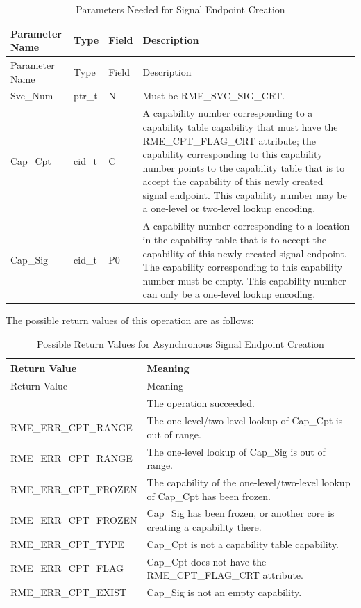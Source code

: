 \begin{xltabular}{\textwidth}{@{}>{\hsize\raggedright\arraybackslash}X>{\hsize\raggedright\arraybackslash}X>{\hsize\raggedright\arraybackslash}X>{\hsize\raggedright\arraybackslash}X@{}}
\caption{Parameters Needed for Signal Endpoint Creation}\label{tab:5-16-create-signal-endpoint-parameters}\\
\toprule
Parameter Name & Type & Field & Description\tabularnewline
\endfirsthead
\toprule
Parameter Name & Type & Field & Description\tabularnewline
\midrule
\endhead
\bottomrule
\endlastfoot
Svc\_Num & ptr\_t & N & Must be RME\_SVC\_SIG\_CRT.\tabularnewline
Cap\_Cpt & cid\_t & C &
A capability number corresponding to a capability table capability that must have the RME\_CPT\_FLAG\_CRT attribute; the capability corresponding to this capability number points to the capability table that is to accept the capability of this newly created signal endpoint. This capability number may be a one-level or two-level lookup encoding.\tabularnewline
Cap\_Sig & cid\_t & P0 &
A capability number corresponding to a location in the capability table that is to accept the capability of this newly created signal endpoint. The capability corresponding to this capability number must be empty. This capability number can only be a one-level lookup encoding.\tabularnewline
\end{xltabular}
\nopagebreak[4]

The possible return values of this operation are as follows:

\begin{xltabular}{\textwidth}{@{}>{\hsize\raggedright\arraybackslash}X>{\hsize\raggedright\arraybackslash}X@{}}
\caption{Possible Return Values for Asynchronous Signal Endpoint Creation}\label{tab:5-17-create-signal-endpoint-return-values}\\
\toprule
Return Value & Meaning\tabularnewline
\endfirsthead
\toprule
Return Value & Meaning\tabularnewline
\midrule
\endhead
\bottomrule
{} & The operation succeeded.\tabularnewline
    RME\_ERR\_CPT\_RANGE & The one-level/two-level lookup of Cap\_Cpt is out of range.\tabularnewline
    RME\_ERR\_CPT\_RANGE & The one-level lookup of Cap\_Sig is out of range.\tabularnewline
    RME\_ERR\_CPT\_FROZEN & The capability of the one-level/two-level lookup of Cap\_Cpt has been frozen.\tabularnewline
    RME\_ERR\_CPT\_FROZEN & Cap\_Sig has been frozen, or another core is creating a capability there.\tabularnewline
    RME\_ERR\_CPT\_TYPE & Cap\_Cpt is not a capability table capability.\tabularnewline
    RME\_ERR\_CPT\_FLAG & Cap\_Cpt does not have the RME\_CPT\_FLAG\_CRT attribute.\tabularnewline
    RME\_ERR\_CPT\_EXIST & Cap\_Sig is not an empty capability.\tabularnewline
\end{xltabular}
\nopagebreak[4]


